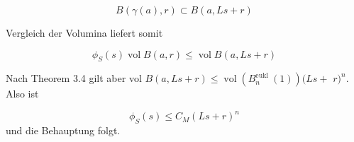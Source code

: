 \documentclass[10pt]{article}
\begin{document}
$$
B(\gamma(a), r) \subset B(a, L s+r)
$$

Vergleich der Volumina liefert somit

$$
\phi_{S}(s) \operatorname{vol} B(a, r) \leq \operatorname{vol} B(a, L s+r)
$$

Nach Theorem 3.4 gilt aber vol $B(a, L s+r) \leq \operatorname{vol}\left(B_{n}^{\text {eukl }}(1)\right)(L s+$ $r)^{n}$. Also ist

$$
\phi_{S}(s) \leq C_{M}(L s+r)^{n}
$$ und die Behauptung folgt.
\end{document}
